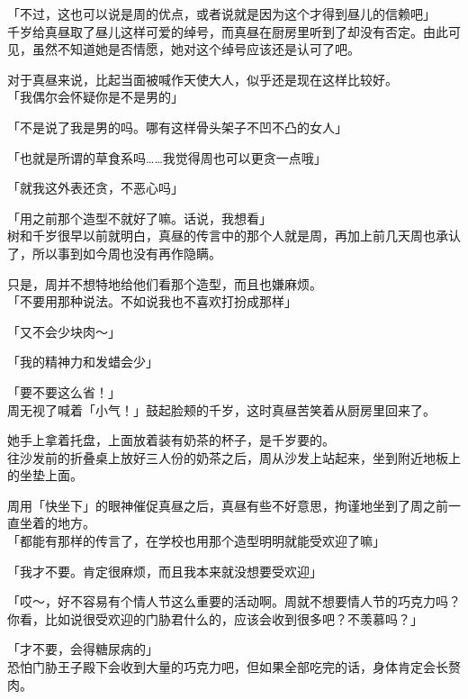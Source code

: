 「不过，这也可以说是周的优点，或者说就是因为这个才得到昼儿的信赖吧」\\

千岁给真昼取了昼儿这样可爱的绰号，而真昼在厨房里听到了却没有否定。由此可见，虽然不知道她是否情愿，她对这个绰号应该还是认可了吧。

对于真昼来说，比起当面被喊作天使大人，似乎还是现在这样比较好。\\

「我偶尔会怀疑你是不是男的」

「不是说了我是男的吗。哪有这样骨头架子不凹不凸的女人」

「也就是所谓的草食系吗……我觉得周也可以更贪一点哦」

「就我这外表还贪，不恶心吗」

「用之前那个造型不就好了嘛。话说，我想看」\\

树和千岁很早以前就明白，真昼的传言中的那个人就是周，再加上前几天周也承认了，所以事到如今周也没有再作隐瞒。

只是，周并不想特地给他们看那个造型，而且也嫌麻烦。\\

「不要用那种说法。不如说我也不喜欢打扮成那样」

「又不会少块肉～」

「我的精神力和发蜡会少」

「要不要这么省！」\\

周无视了喊着「小气！」鼓起脸颊的千岁，这时真昼苦笑着从厨房里回来了。

她手上拿着托盘，上面放着装有奶茶的杯子，是千岁要的。\\

往沙发前的折叠桌上放好三人份的奶茶之后，周从沙发上站起来，坐到附近地板上的坐垫上面。

周用「快坐下」的眼神催促真昼之后，真昼有些不好意思，拘谨地坐到了周之前一直坐着的地方。\\

「都能有那样的传言了，在学校也用那个造型明明就能受欢迎了嘛」

「我才不要。肯定很麻烦，而且我本来就没想要受欢迎」

「哎～，好不容易有个情人节这么重要的活动啊。周就不想要情人节的巧克力吗？你看，比如说很受欢迎的门胁君什么的，应该会收到很多吧？不羡慕吗？」

「才不要，会得糖尿病的」\\

恐怕门胁王子殿下会收到大量的巧克力吧，但如果全部吃完的话，身体肯定会长赘肉。\\

